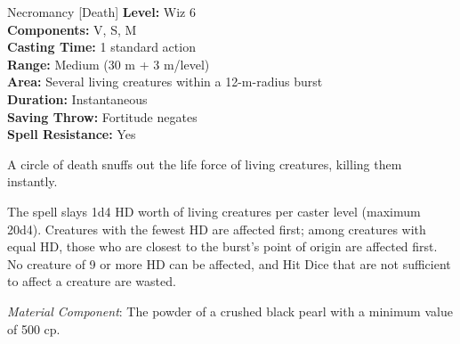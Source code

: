 {Necromancy [Death]}
{
	\textbf{Level:}
	Wiz 6\\
	\textbf{Components:}
	V, S, M\\
	\textbf{Casting Time:}
	1 standard action\\
	\textbf{Range:}
	Medium (30 m + 3 m/level)\\
	\textbf{Area:}
	Several living creatures within a 12-m-radius burst\\
	\textbf{Duration:}
	Instantaneous\\
	\textbf{Saving Throw:}
	Fortitude negates\\
	\textbf{Spell Resistance:}
	Yes\\
}
{
	A circle of death snuffs out the life force of living creatures, killing them instantly.

	The spell slays 1d4 HD worth of living creatures per caster level (maximum 20d4). Creatures with the fewest HD are affected first; among creatures with equal HD, those who are closest to the burst's point of origin are affected first. No creature of 9 or more HD can be affected, and Hit Dice that are not sufficient to affect a creature are wasted.

	\textit{Material Component}:
	The powder of a crushed black pearl with a minimum value of 500 cp.

}

